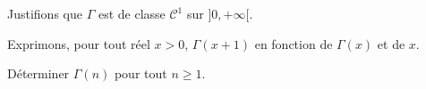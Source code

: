 \documentclass[a4paper,10pt]{report}
\begin{document}
\vspace{6cm}

\newpage

\noindent Justifions que $\Gamma$ est de classe $\mathcal{C}^1$ sur $]0, + \infty[$.

\vspace{13cm}



\noindent Exprimons, pour tout réel $x>0$, $\Gamma(x+1)$ en fonction de $\Gamma(x)$ et de $x$.

\vspace{7cm}

\noindent 

\noindent Déterminer $\Gamma(n)$ pour tout $n \geq 1$.

\vspace{5cm}
\end{document}

